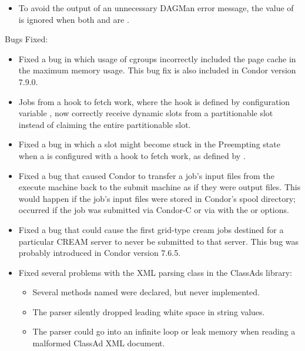 \begin{itemize}

\item To avoid the output of an unnecessary DAGMan error message,
the value of 
is ignored when both 
and  are .

\end{itemize}

\noindent Bugs Fixed:

\begin{itemize}

\item Fixed a bug in which usage of cgroups incorrectly included the
page cache in the maximum memory usage.
This bug fix is also included in Condor version 7.9.0.

\item Jobs from a hook to fetch work, 
where the hook is defined by configuration variable 
,
now correctly receive dynamic slots from a partitionable slot 
instead of claiming the entire partitionable slot.

\item Fixed a bug in which a slot might become stuck in the Preempting state
when a  is configured with a hook to fetch work,
as defined by .

\item Fixed a bug that caused Condor to transfer a job's input files from
the execute machine back to the submit machine as if they were output files.
This would happen if the
job's input files were stored in Condor's spool directory;
occurred if the job was submitted via Condor-C or via 
 with the  or  options.

\item Fixed a bug that could cause the first grid-type cream jobs destined 
for a particular CREAM server to never be submitted to that server.
This bug was probably introduced in Condor version 7.6.5.

\item Fixed several problems with the XML parsing class
 in the ClassAds library:
  \begin{itemize}
  \item Several methods named  were declared, 
  but never implemented. 
  \item The parser silently dropped leading white space in string values.
  \item The parser could go into an infinite loop or leak memory when
    reading a malformed ClassAd XML document. 
  \end{itemize}


\end{itemize}
